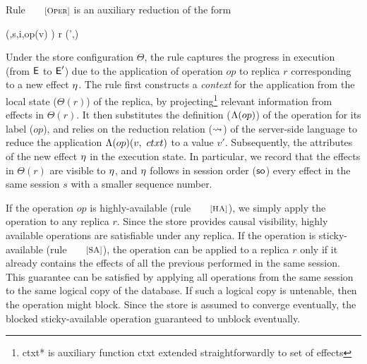 Rule $\rulelabel{Oper}$ is an auxiliary reduction of the form

\begin{smathpar}
\auxred{\Theta} {(\E,\langle s,i,op(v) \rangle)} {r} {(\E',\eff)}
\end{smathpar}

\noindent Under the store configuration $\Theta$, the rule captures
the progress in execution (from ${\normalfont \textsf{E}}$ to ${\normalfont \textsf{E}}'$) due to the application
of operation $op$ to replica $r$ corresponding to a new effect $\eta$.
The rule first constructs a \emph{context} for the application from
the local state ($\Theta(r)$) of the replica, by
projecting\footnote{{\textsf{ctxt*}} is auxiliary function
\textsf{ctxt} extended straightforwardly to set of effects} relevant information from
effects in $\Theta(r)$. It then substitutes the definition
($\Lambda(op)$) of the operation for its label ($op$), and relies on the
reduction relation (${\normalfont \leadsto}$) of the server-side language to
reduce the application $\Lambda(op)(v,~ctxt)$ to a value $v'$.
Subsequently, the attributes of the new effect $\eta$ in the execution
state. In particular, we record that the effects in $\Theta(r)$ are
visible to $\eta$, and $\eta$ follows in session order (${\normalfont \textsf{so}}$) every
effect in the same session $s$ with a smaller sequence number.

If the operation $op$ is highly-available (rule $\rulelabel{HA}$), we
simply apply the operation to any replica $r$. Since the store
provides causal visibility, highly available operations are
satisfiable under any replica. If the operation is sticky-available
(rule $\rulelabel{SA}$), the operation can be applied to a replica $r$
only if it already contains the effects of all the previous performed
in the same session. This guarantee can be satisfied by applying all
operations from the same session to the same logical copy of the
database. If such a logical copy is untenable, then the operation
might block. Since the store is assumed to converge eventually, the
blocked sticky-available operation guaranteed to unblock eventually.

